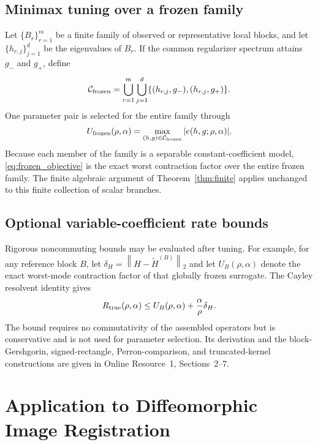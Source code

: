 \documentclass[pdflatex,iicol,sn-mathphys-num]{sn-jnl}
\theoremstyle{definition}
\newcommand{\norm}[1]{\left\lVert #1\right\rVert}
\newcommand{\Ufrozen}{U_{\mathrm{frozen}}}
\begin{document}
\subsection{Minimax tuning over a frozen family}
Let $\{B_r\}_{r=1}^m$ be a finite family of observed or representative local
blocks, and let $\{h_{r,j}\}_{j=1}^d$ be the eigenvalues of $B_r$. If the
common regularizer spectrum attains $g_-$ and $g_+$, define
\[
\mathcal C_{\rm frozen}
=\bigcup_{r=1}^m\bigcup_{j=1}^d
\{(h_{r,j},g_-),(h_{r,j},g_+)\}.
\]
One parameter pair is selected for the entire family through
\begin{equation}
\Ufrozen(\rho,\alpha)=
\max_{(h,g)\in\mathcal C_{\rm frozen}}|e(h,g;\rho,\alpha)|.
\label{eq:frozen_objective}
\end{equation}
Because each member of the family is a separable constant-coefficient model,
\eqref{eq:frozen_objective} is the exact worst contraction factor over the
entire frozen family. The finite algebraic argument of
Theorem~\ref{thm:finite} applies unchanged to this finite collection of scalar
branches.

\subsection{Optional variable-coefficient rate bounds}
Rigorous noncommuting bounds may be evaluated after tuning. For example, for
any reference block $B$, let
$\delta_H=\norm{H-\widetilde H^{(B)}}_2$ and let
$U_B(\rho,\alpha)$ denote the exact worst-mode contraction factor of that
globally frozen surrogate. The Cayley resolvent identity gives
\begin{equation}
R_{\rm true}(\rho,\alpha)
\le U_B(\rho,\alpha)+\frac{\alpha}{\rho}\delta_H.
\label{eq:additive_bound}
\end{equation}
The bound requires no commutativity of the assembled operators but is
conservative and is not used for parameter selection. Its derivation and the
block-Gershgorin, signed-rectangle, Perron-comparison, and truncated-kernel
constructions are given in Online Resource~1, Sections~2--7.

\section{Application to Diffeomorphic Image Registration}\label{sec:registration}
\end{document}
